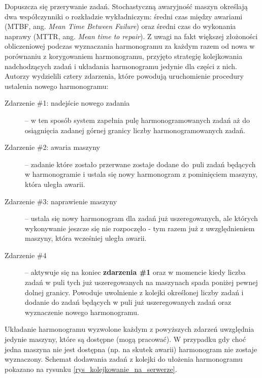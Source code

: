 \documentclass[printmode,oneside]{mgr}
\begin{document}
Dopuszcza się przerywanie zadań. Stochastyczną awaryjność maszyn określają dwa współczynniki o rozkładzie wykładniczym: średni czas między awariami (MTBF, ang. \emph{Mean Time Between Failure}) oraz średni czas do wykonania naprawy (MTTR, ang. \emph{Mean time to repair}). Z uwagi na fakt większej złożoności obliczeniowej podczas wyznaczania harmonogramu za każdym razem od nowa w porównaniu z korygowaniem harmonogramu, przyjęto strategię kolejkowania nadchodzących zadań i układania harmonogramu jedynie dla części z nich. Autorzy wydzielili cztery zdarzenia, które powodują uruchomienie procedury ustalenia nowego harmonogramu:
\begin{description}
    \item[Zdarzenie \#1: nadejście nowego zadania] -- w ten sposób system zapełnia pulę harmonogramowanych zadań aż do osiągnięcia zadanej górnej granicy liczby harmonogramowanych zadań.
    \item[Zdarzenie \#2: awaria maszyny] -- zadanie które zostało przerwane zostaje dodane do~puli zadań będących w harmonogramie i ustala się nowy harmonogram z pominięciem maszyny, która uległa awarii.
    \item[Zdarzenie \#3: naprawienie maszyny] -- ustala się nowy harmonogram dla zadań już uszeregowanych, ale których wykonywanie jeszcze się nie rozpoczęło - tym razem już z uwzględnieniem maszyny, która wcześniej uległa awarii.
    \item[Zdarzenie \#4] -- aktywuje się na koniec \textbf{zdarzenia \#1} oraz w momencie kiedy liczba zadań w puli tych już uszeregowanych na maszynach spada poniżej pewnej dolnej granicy. Powoduje uwolnienie z kolejki określonej liczby zadań i dodanie do zadań będących w puli już uszeregowanych zadań oraz wyznaczenie nowego harmonogramu.
\end{description}
Układanie harmonogramu wyzwolone każdym z powyższych zdarzeń uwzględnia jedynie maszyny, które są dostępne (mogą pracować). W przypadku gdy choć jedna maszyna nie jest dostępna (np. na skutek awarii) harmonogram nie zostaje wyznaczony. Schemat dodawania zadań z kolejki do ułożenia harmonogramu pokazano na rysunku \ref{rys_kolejkowanie_na_serwerze}.
\end{document}
